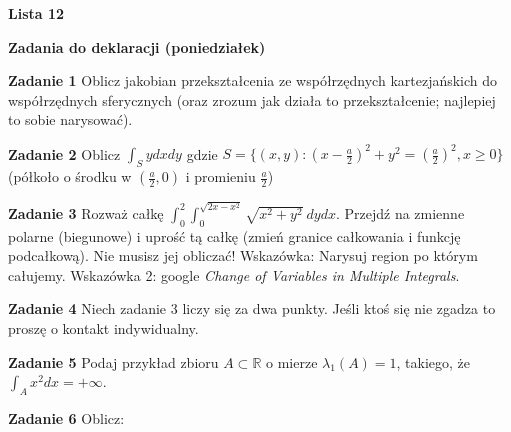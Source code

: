 \documentclass[a4paper,11pt]{article}
\newcommand{\RR}{\mathbb{R}}
\begin{document}
\begin{center}
  {\large\textbf{Lista 12}}
\end{center}

\hrulefill
\begin{center}
    \textbf{Zadania do deklaracji (poniedziałek)}
\end{center}

\bigskip

\textbf{Zadanie 1} Oblicz jakobian przekształcenia ze współrzędnych
kartezjańskich do współrzędnych sferycznych (oraz zrozum jak działa to
przekształcenie; najlepiej to sobie narysować).

\bigskip

\textbf{Zadanie 2} Oblicz $\int_S y dxdy$ gdzie  $S = \{(x,y):
\left(x-\frac{a}{2}\right)^2 + y^2 = \left(\frac{a}{2}\right)^2, x\ge 0\}
$ (półkoło o środku w $(\frac{a}{2},0)$ i promieniu $\frac{a}{2}$)

\bigskip

\textbf{Zadanie 3} Rozważ całkę $\int_{0}^2 \int_{0}^{\sqrt{2x-x^2}}
\sqrt{x^2 + y^2}~dydx$. Przejdź na zmienne polarne (biegunowe) i uprość
tą całkę (zmień granice całkowania i funkcję podcałkową). Nie musisz jej
obliczać! Wskazówka: Narysuj region po którym całujemy. Wskazówka 2:
google \textit{Change of Variables in Multiple Integrals}.

\bigskip

\textbf{Zadanie 4} Niech zadanie 3 liczy się za dwa punkty. Jeśli ktoś
się nie zgadza to proszę o kontakt indywidualny.

\bigskip

\hrulefill

\bigskip

\textbf{Zadanie 5} Podaj przykład zbioru $A \subset \RR$ o mierze
$\lambda_1(A) = 1$, takiego, że  $\int_A x^2 dx = +\infty$.

\bigskip

\textbf{Zadanie 6} Oblicz:
\end{document}
